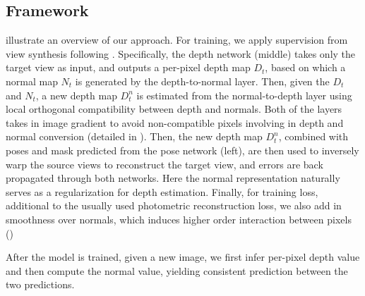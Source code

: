 

\subsection{Framework}
 illustrate an overview of our approach. For training, we apply supervision from view synthesis following \cite{zhou2017unsupervised}. Specifically, the depth network (middle) takes only the target view as input, and
outputs a per-pixel depth map $D_t$, based on which a normal map $N_t$ is generated by the depth-to-normal layer. Then, given the $D_t$ and $N_t$, a new depth map $D_t^n$ is estimated from the normal-to-depth layer using local orthogonal compatibility between depth and normals. Both of the layers takes in image gradient to avoid non-compatible pixels involving in depth and normal conversion (detailed in ).
Then, the new depth map $D_t^n$, combined with poses and mask predicted from the pose network (left), are then used to inversely warp the source views to reconstruct the target view, and errors are back propagated through both networks. Here the normal representation naturally serves as a regularization for depth estimation. Finally, for training loss, additional to the usually used photometric reconstruction loss, we also add in smoothness over normals, which induces higher order interaction between pixels ()

After the model is trained, given a new image,  we first infer per-pixel depth value and then compute the normal value, yielding consistent prediction between the two predictions.




